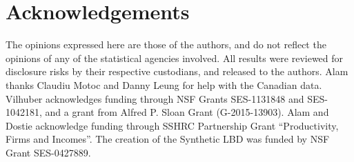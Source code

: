 \documentclass[10pt]{article}
\begin{document}
 

\section*{Acknowledgements}

The opinions expressed here are those of the authors, and do not reflect the opinions of any of the statistical agencies involved. All results were reviewed for disclosure risks by their respective custodians, and released to the authors.  Alam thanks Claudiu Motoc and Danny Leung for help with the Canadian data.  Vilhuber acknowledges funding through NSF Grants SES-1131848 and SES-1042181, and a grant from Alfred P. Sloan Grant (G-2015-13903). Alam and Dostie acknowledge funding through SSHRC Partnership Grant ``Productivity, Firms and Incomes''. The creation of the Synthetic LBD  was funded by NSF Grant SES-0427889.


\printbibliography



  
\end{document}
